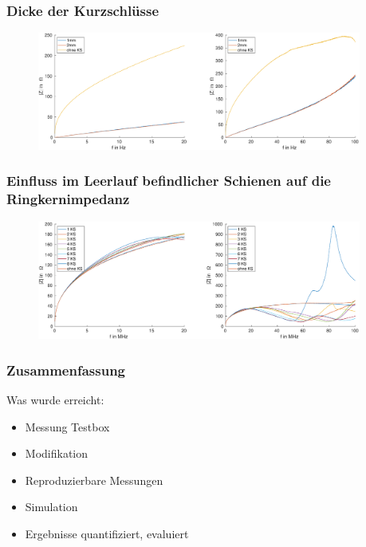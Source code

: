 \documentclass[accentcolor=tud9b, colorbacktitle, inverttitle]{tudbeamer}
\begin{document}



\begin{frame}\frametitle{Dicke der Kurzschlüsse}
\vspace{-1em}
\begin{figure}[h]
	\centering
	\includegraphics[width=0.95\textwidth]{Z_RK_thick_1KS}
\end{figure}
\end{frame}



\begin{frame}\frametitle{Einfluss im Leerlauf befindlicher Schienen auf die Ringkernimpedanz}
\vspace{-1em}
\begin{figure}[h]
	\centering
	\includegraphics[width=0.95\textwidth]{Z_RK_numKS_open}
\end{figure}
\end{frame}

\begin{frame}\frametitle{Zusammenfassung}
Was wurde erreicht:
\begin{itemize}
	\item Messung Testbox
	\item Modifikation 
	\item Reproduzierbare Messungen
	\item Simulation
	\item Ergebnisse quantifiziert, evaluiert
\end{itemize}
\end{frame}
\end{document}
